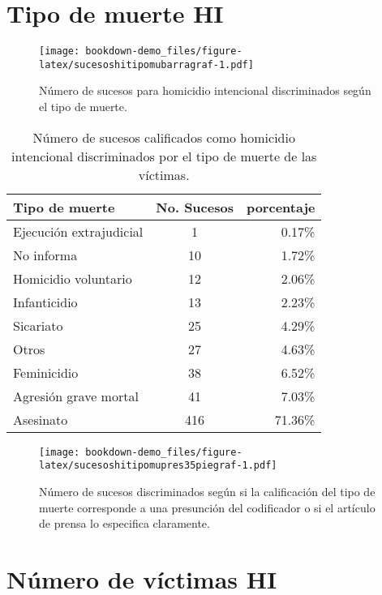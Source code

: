 \documentclass[
]{book}
\begin{document}
\hypertarget{tipo-de-muerte-hi}{%
\section{Tipo de muerte HI}\label{tipo-de-muerte-hi}}





\begin{figure}
\centering
\texttt{[image: bookdown-demo\_files/figure-latex/sucesoshitipomubarragraf-1.pdf]}
\caption{\label{fig:sucesoshitipomubarragraf}Número de sucesos para homicidio intencional discriminados según el tipo de muerte.}
\end{figure}

\begin{table}

\caption{\label{tab:sucesohitipomuhitable}Número de sucesos calificados como homicidio intencional discriminados por el tipo de muerte de las víctimas.}
\centering
\begin{tabular}[t]{lcr}
\toprule
Tipo de muerte & No. Sucesos & porcentaje\\
\midrule
Ejecución extrajudicial & 1 & 0.17\%\\
No informa & 10 & 1.72\%\\
Homicidio voluntario & 12 & 2.06\%\\
Infanticidio & 13 & 2.23\%\\
Sicariato & 25 & 4.29\%\\
\addlinespace
Otros & 27 & 4.63\%\\
Feminicidio & 38 & 6.52\%\\
Agresión grave mortal & 41 & 7.03\%\\
Asesinato & 416 & 71.36\%\\
\bottomrule
\end{tabular}
\end{table}

\begin{figure}
\centering
\texttt{[image: bookdown-demo\_files/figure-latex/sucesoshitipomupres35piegraf-1.pdf]}
\caption{\label{fig:sucesoshitipomupres35piegraf}Número de sucesos discriminados según si la calificación del tipo de muerte corresponde a una presunción del codificador o si el artículo de prensa lo especifica claramente.}
\end{figure}

\hypertarget{nuxfamero-de-vuxedctimas-hi}{%
\section{Número de víctimas HI}\label{nuxfamero-de-vuxedctimas-hi}}
\end{document}
